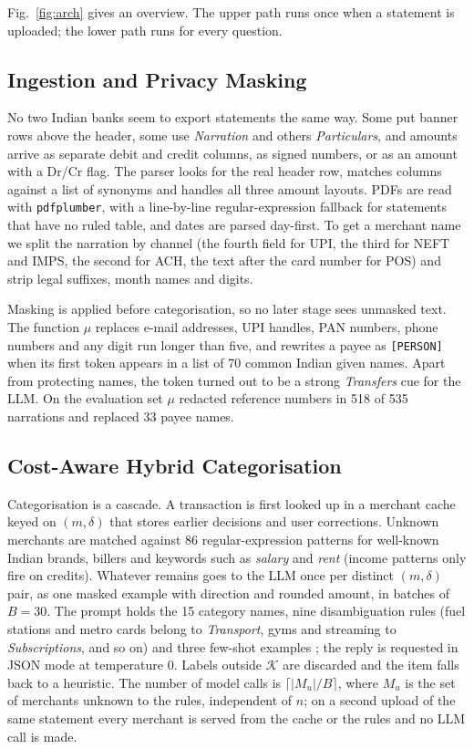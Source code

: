 \documentclass[conference]{IEEEtran}
\begin{document}
Fig.~\ref{fig:arch} gives an overview. The upper path runs once when a statement is uploaded; the lower path runs for every question.

\subsection{Ingestion and Privacy Masking}
No two Indian banks seem to export statements the same way. Some put banner rows above the header, some use \emph{Narration} and others \emph{Particulars}, and amounts arrive as separate debit and credit columns, as signed numbers, or as an amount with a Dr/Cr flag. The parser looks for the real header row, matches columns against a list of synonyms and handles all three amount layouts. PDFs are read with \texttt{pdfplumber}, with a line-by-line regular-expression fallback for statements that have no ruled table, and dates are parsed day-first. To get a merchant name we split the narration by channel (the fourth field for UPI, the third for NEFT and IMPS, the second for ACH, the text after the card number for POS) and strip legal suffixes, month names and digits.

Masking is applied before categorisation, so no later stage sees unmasked text. The function $\mu$ replaces e-mail addresses, UPI handles, PAN numbers, phone numbers and any digit run longer than five, and rewrites a payee as \texttt{[PERSON]} when its first token appears in a list of 70 common Indian given names. Apart from protecting names, the token turned out to be a strong \emph{Transfers} cue for the LLM. On the evaluation set $\mu$ redacted reference numbers in 518 of 535 narrations and replaced 33 payee names.

\subsection{Cost-Aware Hybrid Categorisation}
Categorisation is a cascade. A transaction is first looked up in a merchant cache keyed on $(m,\delta)$ that stores earlier decisions and user corrections. Unknown merchants are matched against 86 regular-expression patterns for well-known Indian brands, billers and keywords such as \emph{salary} and \emph{rent} (income patterns only fire on credits). Whatever remains goes to the LLM once per distinct $(m,\delta)$ pair, as one masked example with direction and rounded amount, in batches of $B=30$. The prompt holds the 15 category names, nine disambiguation rules (fuel stations and metro cards belong to \emph{Transport}, gyms and streaming to \emph{Subscriptions}, and so on) and three few-shot examples \cite{brown2020}; the reply is requested in JSON mode at temperature 0. Labels outside $\mathcal{K}$ are discarded and the item falls back to a heuristic. The number of model calls is $\lceil |M_u|/B\rceil$, where $M_u$ is the set of merchants unknown to the rules, independent of $n$; on a second upload of the same statement every merchant is served from the cache or the rules and no LLM call is made.
\end{document}
